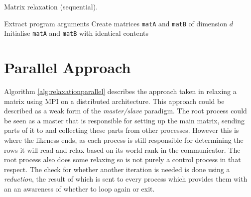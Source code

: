 \documentclass[11pt]{article}
\begin{document}
\LinesNumbered
\DontPrintSemicolon
\SetAlgoLined
\colorbox[gray]{0.95}{
\begin{minipage}{\textwidth}
\begin{algorithm}[H]
  	\caption{Matrix relaxation (sequential).\label{alg:relaxationsequential}}
  	{\color{darkgray}
	}
	\BlankLine
	{\color{darkgray}Extract program arguments\;
 	Create matrices \texttt{matA} and \texttt{matB} of dimension $d$\;
 	Initialise \texttt{matA} and \texttt{matB} with identical contents\;
 	\BlankLine
 	}
\end{algorithm}
\end{minipage}}
\normalsize
\newpage
{\color{indigo}
\section{Parallel Approach}
\label{sec:disapproach}}
Algorithm \ref{alg:relaxationparallel} describes the approach taken in relaxing a matrix using MPI on a distributed architecture. This approach could be described as a weak form of the \textit{master/slave} paradigm. The root process could be seen as a master that is responsible for setting up the main matrix, sending parts of it to and collecting these parts from other processes. However this is where the likeness ends, as each process is still responsible for determining the rows it will read and relax based on its world rank in the communicator. The root process also does some relaxing so is not purely a control process in that respect. The check for whether another iteration is needed is done using a \textit{reduction}, the result of which is sent to every process which provides them with an an awareness of whether to loop again or exit. 
\end{document}
